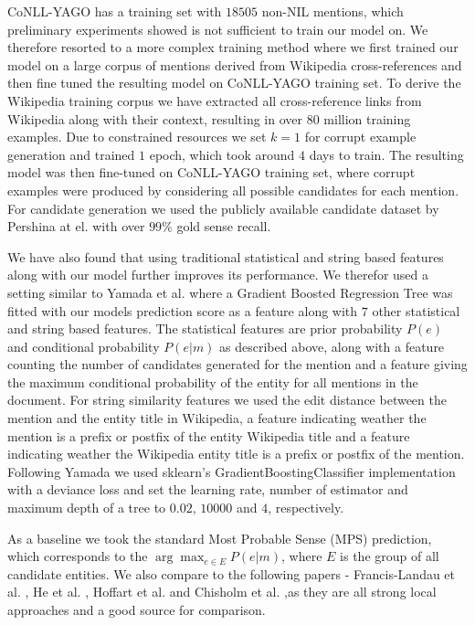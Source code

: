 \documentclass[11pt]{article}
\begin{document}
CoNLL-YAGO has a training set with $18505$ non-NIL mentions, which preliminary experiments showed is not sufficient to train our model on. We therefore resorted to a more complex training method where we first trained our model on a large corpus of mentions derived from Wikipedia cross-references and then fine tuned the resulting model on CoNLL-YAGO training set. To derive the Wikipedia training corpus we have extracted all cross-reference links from Wikipedia along with their context, resulting in over $80$ million training examples. Due to constrained resources we set $k=1$ for corrupt example generation and trained $1$ epoch, which took around $4$ days to train. The resulting model was then fine-tuned on CoNLL-YAGO training set, where corrupt examples were produced by considering all possible candidates for each mention.
For candidate generation we used the publicly available candidate dataset by Pershina at el.  with over $99\%$ gold sense recall.

We have also found that using traditional statistical and string based features along with our model further improves its performance. We therefor used a setting similar to Yamada et al.  where a Gradient Boosted Regression Tree was fitted with our models prediction score as a feature along with $7$ other statistical and string based features. The statistical features are prior probability $P(e)$ and conditional probability $P(e|m)$ as described above, along with a feature counting the number of candidates generated for the mention and a feature giving the maximum conditional probability of the entity for all mentions in the document. For string similarity features we used the edit distance between the mention and the entity title in Wikipedia, a feature indicating weather the mention is a prefix or postfix of the entity Wikipedia title and a feature indicating weather the Wikipedia entity title is a prefix or postfix of the mention. Following Yamada we used sklearn's GradientBoostingClassifier implementation \cite{pedregosa2011scikit} with a deviance loss and set the learning rate, number of estimator and maximum depth of a tree to $0.02$, $10000$ and $4$, respectively. 

As a baseline we took the standard Most Probable Sense (MPS) prediction, which corresponds to the $\arg\max_{e\in{{E}}}{P(e|m)}$, where $E$ is the group of all candidate entities.
We also compare to the following papers - Francis-Landau et al. , He et al. , Hoffart et al.  and Chisholm et al.  ,as they are all strong local approaches and a good source for comparison.
\end{document}
